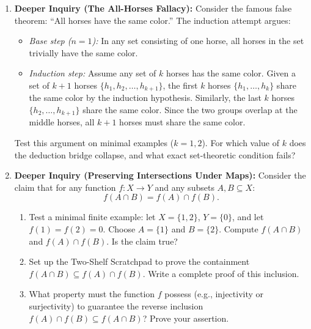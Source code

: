 \begin{enumerate}
\item \textbf{Deeper Inquiry (The All-Horses Fallacy):} Consider the famous false theorem: ``All horses have the same color.'' The induction attempt argues:
\begin{itemize}
\item \emph{Base step ($n = 1$):} In any set consisting of one horse, all horses in the set trivially have the same color.
\item \emph{Induction step:} Assume any set of $k$ horses has the same color. Given a set of $k+1$ horses $\{h_1, h_2, \dots, h_{k+1}\}$, the first $k$ horses $\{h_1, \dots, h_k\}$ share the same color by the induction hypothesis. Similarly, the last $k$ horses $\{h_2, \dots, h_{k+1}\}$ share the same color. Since the two groups overlap at the middle horses, all $k+1$ horses must share the same color.
\end{itemize}
Test this argument on minimal examples ($k = 1, 2$). For which value of $k$ does the deduction bridge collapse, and what exact set-theoretic condition fails?

\item \textbf{Deeper Inquiry (Preserving Intersections Under Maps):} Consider the claim that for any function $f: X \to Y$ and any subsets $A, B \subseteq X$:
\[
f(A \cap B) = f(A) \cap f(B).
\]
\begin{enumerate}[label=(\alph*)]
\item Test a minimal finite example: let $X = \{1, 2\}$, $Y = \{0\}$, and let $f(1) = f(2) = 0$. Choose $A = \{1\}$ and $B = \{2\}$. Compute $f(A \cap B)$ and $f(A) \cap f(B)$. Is the claim true?
\item Set up the Two-Shelf Scratchpad to prove the containment $f(A \cap B) \subseteq f(A) \cap f(B)$. Write a complete proof of this inclusion.
\item What property must the function $f$ possess (e.g., injectivity or surjectivity) to guarantee the reverse inclusion $f(A) \cap f(B) \subseteq f(A \cap B)$? Prove your assertion.
\end{enumerate}
\end{enumerate}

\newpage
